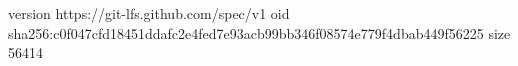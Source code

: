 version https://git-lfs.github.com/spec/v1
oid sha256:c0f047cfd18451ddafc2e4fed7e93acb99bb346f08574e779f4dbab449f56225
size 56414

